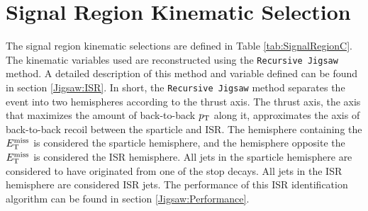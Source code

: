 



\section{Signal Region Kinematic Selection}
\label{sec:SR:Selections}

\indent The signal region kinematic selections are defined in Table \ref{tab:SignalRegionC}.\\

\indent The kinematic variables used are reconstructed using the {\tt Recursive Jigsaw} method.  A detailed description of this method and variable defined can be found in section \ref{Jigsaw:ISR}.  In short, the {\tt Recursive Jigsaw} method separates the event into two hemispheres according to the thrust axis.  The thrust axis, the axis that maximizes the amount of back-to-back $p_{\mathrm{T}}$ along it, approximates the axis of back-to-back recoil between the sparticle and ISR.  The hemisphere containing the $E_{\mathrm{T}}^{\mathrm{miss}}$ is considered the sparticle hemisphere, and the hemisphere opposite the $E_{\mathrm{T}}^{\mathrm{miss}}$ is considered the ISR hemisphere.  All jets in the sparticle hemisphere are considered to have originated from one of the stop decays.  All jets in the ISR hemisphere are considered ISR jets.  The performance of this ISR identification algorithm can be found in section \ref{Jigsaw:Performance}. \\

